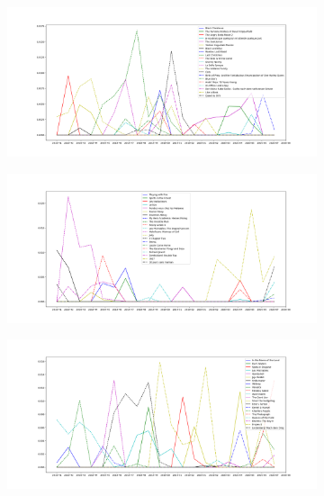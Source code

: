 \documentclass{article}
\begin{document}
\begin{figure}[h!]
  \begin{subfigure}[b]{0.6\textwidth}
    \includegraphics[width=\textwidth]{top5_box_office_usukfrde_results10000itev3_part1.png}
    \label{fig:resdyn1}
  \end{subfigure}
  \begin{subfigure}[b]{0.6\textwidth}
    \includegraphics[width=\textwidth]{top5_box_office_usukfrde_results10000itev3_part2.png}
    \label{fig:resdyn2}
  \end{subfigure}
  \begin{subfigure}[b]{0.6\textwidth}
    \includegraphics[width=\textwidth]{top5_box_office_usukfrde_results10000itev3_part3.png}

\end{subfigure}
\end{figure}
\end{document}

